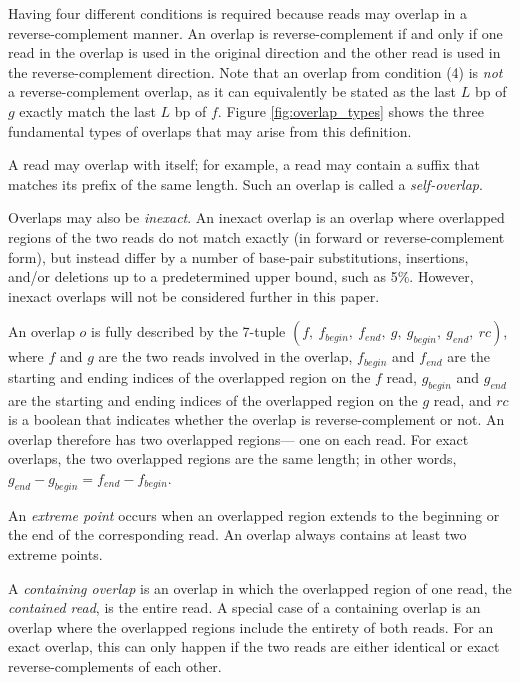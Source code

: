 \documentclass[10pt]{article}
\newcommand{\LengthVar}{L}
\newcommand{\Figure}[1]{Figure \ref{#1}}
\begin{document}
Having four different conditions is required because reads may overlap in a
reverse-complement manner.  An overlap is reverse-complement if and only if one
read in the overlap is used in the original direction and the other read is used
in the reverse-complement direction.  Note that an overlap from condition (4) is
{\it not} a reverse-complement overlap, as it can equivalently be stated as the
last $\LengthVar$ bp of $g$ exactly match the last $\LengthVar$ bp of $f$.
\Figure{fig:overlap_types} shows the three fundamental types of overlaps that
may arise from this definition.

A read may overlap with itself; for example, a read may contain a suffix that
matches its prefix of the same length.  Such an overlap is called a {\it
self-overlap}.

Overlaps may also be {\it inexact}.  An inexact overlap is an overlap where
overlapped regions of the two reads do not match exactly (in forward or
reverse-complement form), but instead differ by a number of base-pair
substitutions, insertions, and/or deletions up to a predetermined upper bound,
such as 5\%.  However, inexact overlaps will not be considered further in this
paper.

An overlap $o$ is fully described by the 7-tuple $(f,\ f_{begin},\ f_{end},\ g,
\ g_{begin},\ g_{end},\ rc)$, where $f$ and $g$ are the two reads involved in the
overlap, $f_{begin}$ and $f_{end}$ are the starting and ending indices of the
overlapped region on the $f$ read, $g_{begin}$ and $g_{end}$ are the starting
and ending indices of the overlapped region on the $g$ read, and $rc$ is a
boolean that indicates whether the overlap is reverse-complement or not.  An
overlap therefore has two overlapped regions--- one on each read.  For exact
overlaps, the two overlapped regions are the same length; in other words,
$g_{end} - g_{begin} = f_{end} - f_{begin}$.

An {\it extreme point} occurs when an overlapped region extends to the beginning
or the end of the corresponding read.  An overlap always contains at least two
extreme points.

A {\it containing overlap} is an overlap in which the overlapped region of one
read, the {\it contained read}, is the entire read.  A special case of a
containing overlap is an overlap where the overlapped regions include the
entirety of both reads.  For an exact overlap, this can only happen if the two
reads are either identical or exact reverse-complements of each other.
\end{document}
